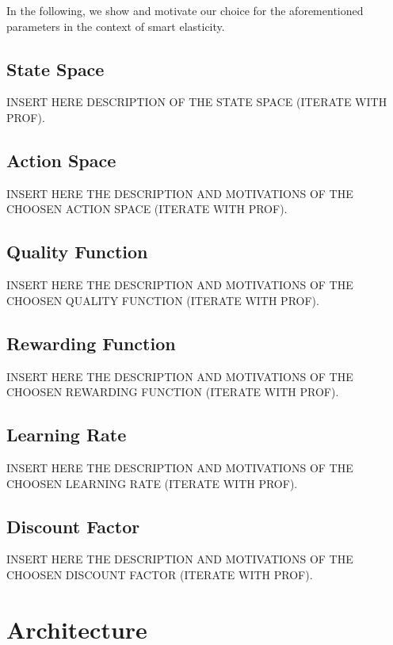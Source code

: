 In the following, we show and motivate our choice for the aforementioned parameters in the context of smart elasticity.


\subsection{State Space}
\label{sec:smart-elasticity-elasticity-leveraging-q-learning-state-space}
INSERT HERE DESCRIPTION OF THE STATE SPACE (ITERATE WITH PROF).


\subsection{Action Space}
\label{sec:smart-elasticity-elasticity-leveraging-q-learning-action-space}
INSERT HERE THE DESCRIPTION AND MOTIVATIONS OF THE CHOOSEN ACTION SPACE (ITERATE WITH PROF).


\subsection{Quality Function}
\label{sec:smart-elasticity-elasticity-leveraging-q-learning-quality-function}
INSERT HERE THE DESCRIPTION AND MOTIVATIONS OF THE CHOOSEN QUALITY FUNCTION (ITERATE WITH PROF).


\subsection{Rewarding Function}
\label{sec:smart-elasticity-elasticity-leveraging-q-learning-rewarding-function}
INSERT HERE THE DESCRIPTION AND MOTIVATIONS OF THE CHOOSEN REWARDING FUNCTION (ITERATE WITH PROF).


\subsection{Learning Rate}
\label{sec:smart-elasticity-elasticity-leveraging-q-learning-learning-rate}
INSERT HERE THE DESCRIPTION AND MOTIVATIONS OF THE CHOOSEN LEARNING RATE (ITERATE WITH PROF).


\subsection{Discount Factor}
\label{sec:smart-elasticity-elasticity-leveraging-q-learning-discount-factor}
INSERT HERE THE DESCRIPTION AND MOTIVATIONS OF THE CHOOSEN DISCOUNT FACTOR (ITERATE WITH PROF).


\section{Architecture}
\label{sec:implementation-architecture}

